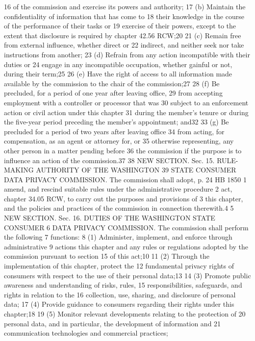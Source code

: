 16 of the commission and exercise its powers and authority;
17 (b) Maintain the confidentiality of information that has come to
18 their knowledge in the course of the performance of their tasks or
19 exercise of their powers, except to the extent that disclosure is
required by chapter 42.56 RCW;20
21 (c) Remain free from external influence, whether direct or
22 indirect, and neither seek nor take instructions from another;
23 (d) Refrain from any action incompatible with their duties or
24 engage in any incompatible occupation, whether gainful or not, during
their term;25
26 (e) Have the right of access to all information made available by
the commission to the chair of the commission;27
28 (f) Be precluded, for a period of one year after leaving office,
29 from accepting employment with a controller or processor that was
30 subject to an enforcement action or civil action under this chapter
31 during the member's tenure or during the five-year period preceding
the member's appointment; and32
33 (g) Be precluded for a period of two years after leaving office
34 from acting, for compensation, as an agent or attorney for, or
35 otherwise representing, any other person in a matter pending before
36 the commission if the purpose is to influence an action of the
commission.37
38 NEW SECTION. Sec. 15. RULE-MAKING AUTHORITY OF THE WASHINGTON
39 STATE CONSUMER DATA PRIVACY COMMISSION. The commission shall adopt,
p. 24 HB 1850
1 amend, and rescind suitable rules under the administrative procedure
2 act, chapter 34.05 RCW, to carry out the purposes and provisions of
3 this chapter, and the policies and practices of the commission in
connection therewith.4
5 NEW SECTION. Sec. 16. DUTIES OF THE WASHINGTON STATE CONSUMER
6 DATA PRIVACY COMMISSION. The commission shall perform the following
7 functions:
8 (1) Administer, implement, and enforce through administrative
9 actions this chapter and any rules or regulations adopted by the
commission pursuant to section 15 of this act;10
11 (2) Through the implementation of this chapter, protect the
12 fundamental privacy rights of consumers with respect to the use of
their personal data;13
14 (3) Promote public awareness and understanding of risks, rules,
15 responsibilities, safeguards, and rights in relation to the
16 collection, use, sharing, and disclosure of personal data;
17 (4) Provide guidance to consumers regarding their rights under
this chapter;18
19 (5) Monitor relevant developments relating to the protection of
20 personal data, and in particular, the development of information and
21 communication technologies and commercial practices;
